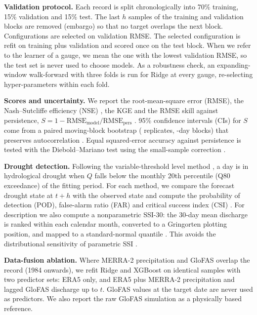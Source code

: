 \documentclass[graybox]{svmult}
\begin{document}
\textbf{Validation protocol.} Each record is split chronologically into 70\% training, 15\% validation and 15\% test. The last $h$ samples of the training and validation blocks are removed (embargo) so that no target overlaps the next block. Configurations are selected on validation RMSE. The selected configuration is refit on training plus validation and scored once on the test block. When we refer to the learner of a gauge, we mean the one with the lowest validation RMSE, so the test set is never used to choose models. As a robustness check, an expanding-window walk-forward with three folds is run for Ridge at every gauge, re-selecting hyper-parameters within each fold.

\textbf{Scores and uncertainty.} We report the root-mean-square error (RMSE), the Nash--Sutcliffe efficiency (NSE) \cite{nash1970}, the KGE \cite{klinggupta2009,knoben2019kge} and the RMSE skill against persistence, $S=1-\mathrm{RMSE}_{\mathrm{model}}/\mathrm{RMSE}_{\mathrm{pers}}$ \cite{murphy1988skill}. 95\% confidence intervals (CIs) for $S$ come from a paired moving-block bootstrap (\nBoot{} replicates, \bootBlock-day blocks) that preserves autocorrelation \cite{kunsch1989block,politis1994stationary}. Equal squared-error accuracy against persistence is tested with the Diebold--Mariano test using the small-sample correction \cite{diebold1995dm,harvey1997dm}.

\textbf{Drought detection.} Following the variable-threshold level method \cite{vanloon2015explained,fleig2006threshold,sutanto2021definitions}, a day is in hydrological drought when $Q$ falls below the monthly 20th percentile (Q80 exceedance) of the fitting period. For each method, we compare the forecast drought state at $t+h$ with the observed state and compute the probability of detection (POD), false-alarm ratio (FAR) and critical success index (CSI) \cite{schaefer1990csi}. For description we also compute a nonparametric SSI-30: the 30-day mean discharge is ranked within each calendar month, converted to a Gringorten plotting position, and mapped to a standard-normal quantile \cite{farahmand2015nonparametric,gringorten1963}. This avoids the distributional sensitivity of parametric SSI \cite{tijdeman2020ssi}.

\textbf{Data-fusion ablation.} Where MERRA-2 precipitation and GloFAS overlap the record (1984 onwards), we refit Ridge and XGBoost on identical samples with two predictor sets: ERA5 only, and ERA5 plus MERRA-2 precipitation and lagged GloFAS discharge up to $t$. GloFAS values at the target date are never used as predictors. We also report the raw GloFAS simulation as a physically based reference.
\end{document}
